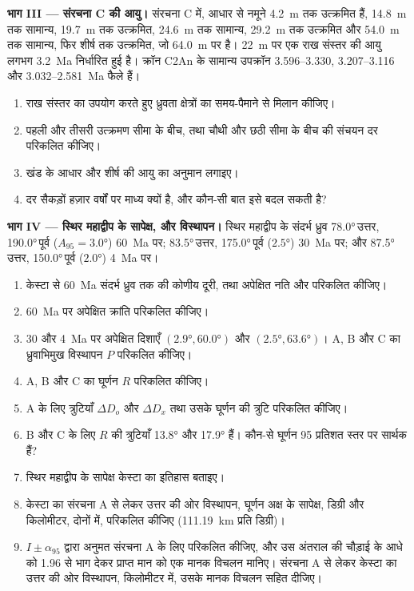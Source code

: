 \begin{problem}
\medskip\noindent\textbf{भाग III --- संरचना C की आयु।} संरचना C में,
आधार से नमूने \qty{4.2}{m} तक उत्क्रमित हैं, \qty{14.8}{m} तक सामान्य,
\qty{19.7}{m} तक उत्क्रमित, \qty{24.6}{m} तक सामान्य, \qty{29.2}{m} तक उत्क्रमित
और \qty{54.0}{m} तक सामान्य, फिर शीर्ष तक उत्क्रमित, जो
\qty{64.0}{m} पर है। \qty{22}{m} पर एक राख संस्तर की आयु लगभग \qty{3.2}{Ma} निर्धारित हुई है।
क्रॉन C2An के सामान्य उपक्रॉन 3.596--3.330, 3.207--3.116 और
3.032--\qty{2.581}{Ma} फैले हैं।
\begin{enumerate}[resume]
  \item राख संस्तर का उपयोग करते हुए ध्रुवता क्षेत्रों का समय-पैमाने से मिलान कीजिए।
  \item पहली और तीसरी उत्क्रमण सीमा के बीच, तथा
        चौथी और छठी सीमा के बीच की संचयन दर परिकलित कीजिए।
  \item खंड के आधार और शीर्ष की आयु का अनुमान लगाइए।
  \item दर सैकड़ों हज़ार वर्षों पर माध्य क्यों है, और
        कौन-सी बात इसे बदल सकती है?
\end{enumerate}

\medskip\noindent\textbf{भाग IV --- स्थिर महाद्वीप के सापेक्ष, और विस्थापन।} स्थिर महाद्वीप के
संदर्भ ध्रुव \ang{78.0}\,उत्तर, \ang{190.0}\,पूर्व
($A_{95} = \ang{3.0}$) \qty{60}{Ma} पर; \ang{83.5}\,उत्तर, \ang{175.0}\,पूर्व
($\ang{2.5}$) \qty{30}{Ma} पर; और \ang{87.5}\,उत्तर, \ang{150.0}\,पूर्व ($\ang{2.0}$)
\qty{4}{Ma} पर।
\begin{enumerate}[resume]
  \item केस्टा से \qty{60}{Ma} संदर्भ
        ध्रुव तक की कोणीय दूरी, तथा अपेक्षित नति और  परिकलित कीजिए।
  \item \qty{60}{Ma} पर अपेक्षित क्रांति परिकलित कीजिए।
  \item 30 और \qty{4}{Ma} पर अपेक्षित दिशाएँ $(\ang{2.9},
        \ang{60.0})$ और $(\ang{2.5}, \ang{63.6})$। A, B और C का ध्रुवाभिमुख
        विस्थापन $P$ परिकलित कीजिए।
  \item A, B और C का घूर्णन $R$ परिकलित कीजिए।
  \item A के लिए त्रुटियाँ $\Delta D_o$ और $\Delta D_x$ तथा
        उसके घूर्णन की त्रुटि परिकलित कीजिए।
  \item B और C के लिए $R$ की त्रुटियाँ \ang{13.8} और \ang{17.9} हैं। कौन-से
        घूर्णन 95 प्रतिशत स्तर पर सार्थक हैं?
  \item स्थिर महाद्वीप के सापेक्ष केस्टा का इतिहास बताइए।
  \item केस्टा का संरचना A से लेकर उत्तर की ओर विस्थापन, घूर्णन अक्ष के सापेक्ष,
        डिग्री और किलोमीटर, दोनों में, परिकलित कीजिए
        (\qty{111.19}{km} प्रति डिग्री)।
  \item $I \pm \alpha_{95}$ द्वारा अनुमत  संरचना A के लिए
        परिकलित कीजिए, और उस अंतराल की चौड़ाई के आधे को
        1.96 से भाग देकर प्राप्त मान को एक मानक विचलन मानिए। संरचना A से लेकर
        केस्टा का उत्तर की ओर विस्थापन, किलोमीटर में, उसके मानक विचलन सहित दीजिए।
\end{enumerate}
\end{problem}
